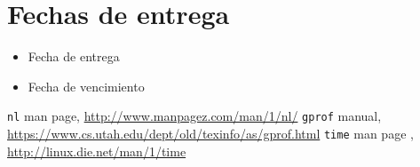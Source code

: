 \documentclass[9pt,a4paper]{article}
\newcommand{\gprof}{\texttt{gprof}}
\newcommand{\nl}{\texttt{nl}}
\newcommand{\unixtime}{\texttt{time}}
\begin{document}
\section{Fechas de entrega}
\begin{itemize}
\item Fecha de entrega
\item Fecha de vencimiento
\end{itemize}

\begin{thebibliography}{99}
\nl{} man page, \url{http://www.manpagez.com/man/1/nl/}
 \gprof{} manual, \url{https://www.cs.utah.edu/dept/old/texinfo/as/gprof.html}
 \unixtime{} man page  , \url{http://linux.die.net/man/1/time}
\end{thebibliography}
\end{document}
